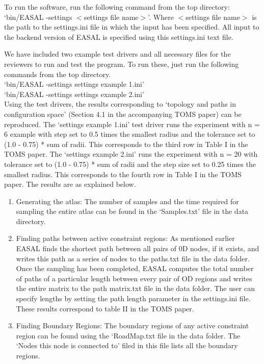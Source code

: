 \documentclass[10pt]{article}
\begin{document}
To run the software, run the following command from the top directory: `bin/EASAL -settings $<$settings file name$>$'.
Where $<$settings file name$>$ is the path to the settings.ini file in which the input has been specified. All
input to the backend version of EASAL is specified using this settings.ini text file.

We have included two example test drivers and all necessary files for the reviewers to run and test the
program. To run these, just run the following commands from the top directory.\\


`bin/EASAL -settings settings example 1.ini'\\


`bin/EASAL -settings settings example 2.ini'\\

Using the test drivers, the results corresponding to `topology and paths in configuration space' (Section
4.1 in the accompanying TOMS paper) can be reproduced. The `settings example 1.ini' test driver runs
the experiment with n = 6 example with step set to 0.5 times the smallest radius and the tolerance set
to (1.0 - 0.75) * sum of radii. This corresponds to the third row in Table I in the TOMS paper. The
`settings example 2.ini' runs the experiment with n = 20 with tolerance set to (1.0 - 0.75) * sum of radii
and the step size set to 0.25 times the smallest radius. This corresponds to the fourth row in Table I in the
TOMS paper. The results are as explained below.


\begin{enumerate}
\item Generating the atlas: The number of samples and the time required for sampling the entire atlas can
be found in the `Samples.txt' file in the data directory.

\item Finding paths between active constraint regions: As mentioned earlier EASAL finds the shortest path
between all pairs of 0D nodes, if it exists, and writes this path as a series of nodes to the paths.txt
file in the data folder. Once the sampling has been completed, EASAL computes the total number
of paths of a particular length between every pair of OD regions and writes the entire matrix to
the path matrix.txt file in the data folder. The user can specify lengths by setting the path length
parameter in the settings.ini file. These results correspond to table II in the TOMS paper.

\item Finding Boundary Regions: The boundary regions of any active constraint region can be found using
the `RoadMap.txt file in the data folder. The `Nodes this node is connected to' filed in this file lists
all the boundary regions.
\end{enumerate}
\end{document}

